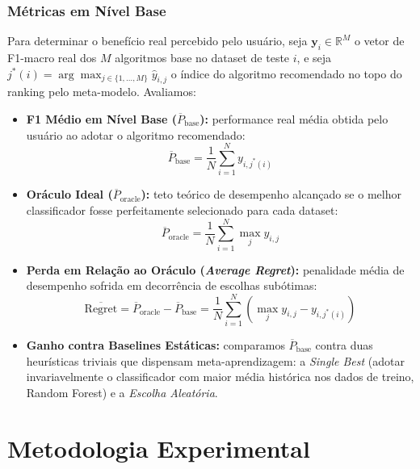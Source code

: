 \documentclass[12pt]{article}
\begin{document}
\subsubsection{Métricas em Nível Base}
Para determinar o benefício real percebido pelo usuário, seja $\mathbf{y}_i \in \mathbb{R}^M$ o vetor de F1-macro real dos $M$ algoritmos base no dataset de teste $i$, e seja $j^*(i) = \arg\max_{j \in \{1, \dots, M\}} \hat{y}_{i, j}$ o índice do algoritmo recomendado no topo do ranking pelo meta-modelo. Avaliamos:
\begin{itemize}
  \item \textbf{F1 Médio em Nível Base ($\overline{P}_{\text{base}}$):} performance real média obtida pelo usuário ao adotar o algoritmo recomendado:
  \begin{equation}
    \overline{P}_{\text{base}} = \frac{1}{N} \sum_{i=1}^N y_{i, j^*(i)}
  \end{equation}
  \item \textbf{Oráculo Ideal ($\overline{P}_{\text{oracle}}$):} teto teórico de desempenho alcançado se o melhor classificador fosse perfeitamente selecionado para cada dataset:
  \begin{equation}
    \overline{P}_{\text{oracle}} = \frac{1}{N} \sum_{i=1}^N \max_{j} y_{i, j}
  \end{equation}
  \item \textbf{Perda em Relação ao Oráculo (\textit{Average Regret}):} penalidade média de desempenho sofrida em decorrência de escolhas subótimas:
  \begin{equation}
    \overline{\text{Regret}} = \overline{P}_{\text{oracle}} - \overline{P}_{\text{base}} = \frac{1}{N} \sum_{i=1}^N \left( \max_{j} y_{i, j} - y_{i, j^*(i)} \right)
  \end{equation}
  \item \textbf{Ganho contra Baselines Estáticas:} comparamos $\overline{P}_{\text{base}}$ contra duas heurísticas triviais que dispensam meta-aprendizagem: a \textit{Single Best} (adotar invariavelmente o classificador com maior média histórica nos dados de treino, Random Forest) e a \textit{Escolha Aleatória}.
\end{itemize}

\section{Metodologia Experimental}
\end{document}
